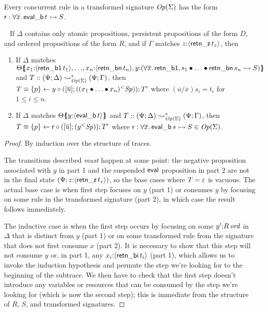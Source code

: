 \noindent
Every concurrent rule in a transformed signature
${\it Op}({\Sigma})$ has the form ${\sf r} : \forall \overline{x}.\,
{\sf eval\_b}\,t \rightarrowtail S$. 



\bigskip
\begin{theorem}[Rearrangement]\label{thm:rearrangement}~
If $\Delta$ contains only atomic propositions, persistent propositions
of the form $D$, and ordered 
propositions of the form $R$, and if $\Gamma$ matches
$z{:}\langle {{\sf retn\_z}\,t_z} \rangle$, 
then 
\begin{enumerate}
\item If $\Delta$ matches 
${\Theta}\mbox{$\{\hspace{-4pt}\{$}{{x_1{:}\langle {{\sf retn\_b1}\,t_1} \rangle},{{\ldots},{{x_n{:}\langle {{\sf retn\_bn}\,t_n} \rangle},{y{:}{(\forall \overline{x}.\,{\sf retn\_b1},s_1 \mathbin{\bullet}\ldots \mathbin{\bullet}{\sf retn\_bn}\,s_n \rightarrowtail S)}}}}}\mbox{$\}\hspace{-4pt}\}$}$ and 
$T :: (\Psi; \Delta) \leadsto^*_{{\it Op}({\Sigma})}
(\Psi; \Gamma)$, then 
$T \equiv \{{p}\} \leftarrow {y} \circ {([{\overline{u}}]; {({({x_1} \mathbin{\bullet}{{\ldots} \mathbin{\bullet}{x_n}})}{^{<}}{{\it Sp}})})}; T'$
where $(\overline{u}/\overline{x})s_i = t_i$ for $1 \leq i \leq n$.
\item If $\Delta$ matches
${\Theta}\mbox{$\{\hspace{-4pt}\{$}{y{:}\langle {{\sf eval\_b}\,t} \rangle}\mbox{$\}\hspace{-4pt}\}$}$ and 
$T :: (\Psi; \Delta) \leadsto^*_{{\it Op}({\Sigma})}
(\Psi; \Gamma)$, 
then $T \equiv \{{p}\} \leftarrow {\sf r} \circ {([{\overline{u}}]; {({y}{^{<}}{{\it Sp}})})}; T'$
where 
${\sf r} : \forall \overline{x}.\,{\sf eval\_b}\,s \rightarrowtail S 
\in {\it Op}({\Sigma})$.
\end{enumerate}
\end{theorem}

\begin{proof}
By induction over the structure of traces.

The transitions described {\it must} happen at some point: the
negative proposition associated with $y$ in part 1 and the suspended
${\sf eval}$ proposition in part 2 are not in the final state $(\Psi;
z{:}\langle {{\sf retn\_z}\,t_z} \rangle)$, so the base cases where $T =
\varepsilon$ is vacuous. The actual base case is when first step 
focuses on $y$ (part 1) or consumes $y$ by focusing on some 
rule in the transformed signature (part 2), in which case the 
result follows immediately. 

The inductive case is when the first step occurs by focusing on 
some 
$y'{:}{R}\,{{\it ord}}$ in $\Delta$ that is distinct from $y$ (part 1)
or on some
transformed rule from the signature that does not first 
consume $x$ (part 2). It is necessary to show that this step will not
consume $y$ or, in part 1, any $x_i{:}\langle {{\sf retn\_bi}\,t_i} \rangle$ (part 1),
which allows us to invoke the induction hypothesis and permute the
step we're looking for to the beginning of the subtrace. We then have
to check that the first step doesn't introduce any variables or resources
that can be consumed by the step we're looking for (which is now the second
step); this is immediate from the structure of $R$, $S$, and transformed
signatures. 
\end{proof}

